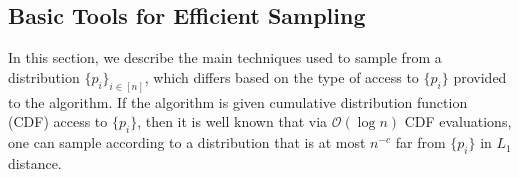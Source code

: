 






\subsection{Basic Tools for Efficient Sampling}
\label{sec:basic_tools_for_efficient_sampling}
In this section, we describe the main techniques used to sample from a distribution $\{ p_i\}_{i\in [n]}$,
which differs based on the type of access to $\{p_i\}$ provided to the algorithm.
If the algorithm is given cumulative distribution function (CDF) access to $\{p_i\}$,
then it is well known that via $\mathcal O(\log n)$ CDF evaluations, one can sample according
to a distribution that is at most $n^{-c}$ far from $\{p_i\}$ in $L_1$ distance.

